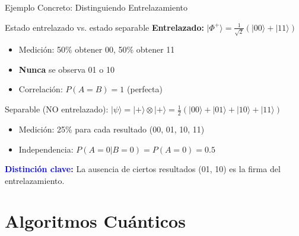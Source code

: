 \documentclass[aspectratio=169]{beamer}
\begin{document}
\begin{frame}{Ejemplo Concreto: Distinguiendo Entrelazamiento}
\small
\begin{exampleblock}{Estado entrelazado vs. estado separable}
\textbf{Entrelazado:} $|\Phi^+\rangle = \frac{1}{\sqrt{2}}(|00\rangle + |11\rangle)$
\begin{itemize}
\item Medición: 50\% obtener 00, 50\% obtener 11
\item \textbf{Nunca} se observa 01 o 10
\item Correlación: $P(A=B) = 1$ (perfecta)
\end{itemize}
\end{exampleblock}

\vspace{0.15cm}
\begin{exampleblock}{Separable (NO entrelazado):}
$|\psi\rangle = |+\rangle \otimes |+\rangle = \frac{1}{2}(|00\rangle + |01\rangle + |10\rangle + |11\rangle)$
\begin{itemize}
\item Medición: 25\% para cada resultado (00, 01, 10, 11)
\item Independencia: $P(A=0|B=0) = P(A=0) = 0.5$
\end{itemize}
\end{exampleblock}

\textcolor{blue}{\textbf{Distinción clave:}} La ausencia de ciertos resultados (01, 10) es la firma del entrelazamiento.
\end{frame}

\section{Algoritmos Cuánticos}
\end{document}
